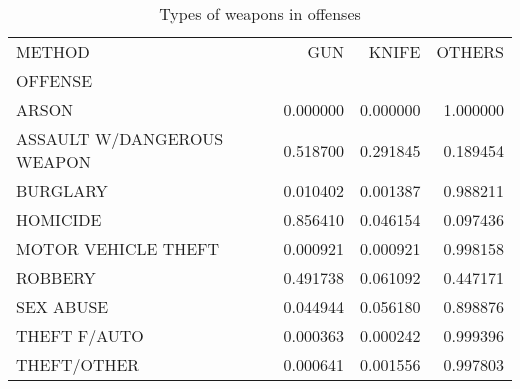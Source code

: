 \begin{table}
\centering
\caption{Types of weapons in offenses}
\label{tab:method_offense_prop}
\begin{tabular}{lrrr}
\toprule
METHOD &       GUN &     KNIFE &    OTHERS \\
OFFENSE                    &           &           &           \\
\midrule
ARSON                      &  0.000000 &  0.000000 &  1.000000 \\
ASSAULT W/DANGEROUS WEAPON &  0.518700 &  0.291845 &  0.189454 \\
BURGLARY                   &  0.010402 &  0.001387 &  0.988211 \\
HOMICIDE                   &  0.856410 &  0.046154 &  0.097436 \\
MOTOR VEHICLE THEFT        &  0.000921 &  0.000921 &  0.998158 \\
ROBBERY                    &  0.491738 &  0.061092 &  0.447171 \\
SEX ABUSE                  &  0.044944 &  0.056180 &  0.898876 \\
THEFT F/AUTO               &  0.000363 &  0.000242 &  0.999396 \\
THEFT/OTHER                &  0.000641 &  0.001556 &  0.997803 \\
\bottomrule
\end{tabular}
\end{table}
